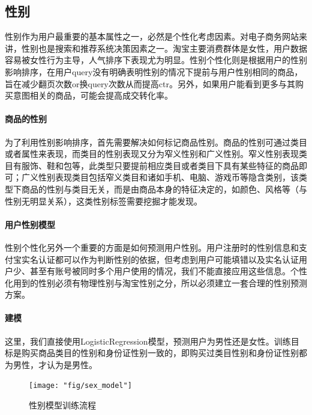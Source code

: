 	\subsection{性别}
	性别作为用户最重要的基本属性之一，必然是个性化考虑因素。对电子商务网站来讲，性别也是搜索和推荐系统决策因素之一。淘宝主要消费群体是女性，用户数据容易被女性行为主导，人气排序下表现尤为明显。性别个性化则是根据用户的性别影响排序，在用户query没有明确表明性别的情况下提前与用户性别相同的商品，旨在减少翻页次数or换query次数从而提高ctr。另外，如果用户能看到更多与其购买意图相关的商品，可能会提高成交转化率。
	
	\paragraph{商品的性别}
	
	为了利用性别影响排序，首先需要解决如何标记商品性别。商品的性别可通过类目或者属性来表现，而类目的性别表现又分为窄义性别和广义性别。窄义性别表现类目有服饰、鞋和包等，此类型只要提前相应类目或者类目下具有某些特征的商品即可；广义性别表现类目包括窄义类目和诸如手机、电脑、游戏币等隐含类别，该类型下商品的性别与类目无关，而是由商品本身的特征决定的，如颜色、风格等（与性别无明显关系），这类性别标签需要挖掘才能发现。
	
	\paragraph{用户性别模型}
	
	性别个性化另外一个重要的方面是如何预测用户性别。用户注册时的性别信息和支付宝实名认证都可以作为判断性别的依据，但考虑到用户可能填错以及实名认证用户少、甚至有账号被同时多个用户使用的情况，我们不能直接应用这些信息。个性化用到的性别必须有物理性别与淘宝性别之分，所以必须建立一套合理的性别预测方案。
	
	\paragraph{建模}
	
	这里，我们直接使用LogisticRegression模型，预测用户为男性还是女性。训练目标是购买商品类目的性别和身份证性别一致的，即购买过类目性别和身份证性别都为男性，才认为是男性。
	
	 \begin{figure}[h]
		\centering
		\texttt{[image: "fig/sex\_model"]}
		\caption{性别模型训练流程}
		\label{fig:sex_model}
	\end{figure}

